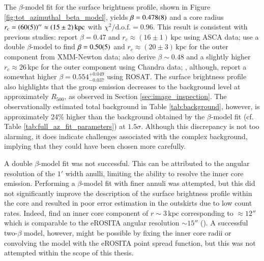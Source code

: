 The \(\beta\)-model fit for the surface brightness profile, shown in Figure \ref{fig:tot_azimuthal_beta_model}, yields \(\beta = \num{0.478\pm0.008}\) and a core radius \(r_c = (\num{60\pm5})'' \approx (15\pm2)\,\text{kpc}\) with \(\chi^2/\text{d.o.f.} = 0.96\). This result is consistent with previous studies: \citep{Kawaharada_2003} report \(\beta = 0.47\) and \(r_c \approx (16\pm1)\,\text{kpc}\) using ASCA data; \citep{Kawaharada_2009} use a double \(\beta\)-model to find \(\beta = \num{0.50\pm0.05}\) and \(r_c \approx (20\pm3)\,\text{kpc}\) for the outer component from XMM-Newton data; \citep{Sun_2003} also derive \(\beta \sim 0.48\) and a slightly higher \(r_c \approx 26\,\text{kpc}\) for the outer component using Chandra data; \citep{Reiprich_2002}, although, report a somewhat higher \(\beta = 0.554^{+0.049}_{-0.037}\) using ROSAT. The surface brightness profile also highlights that the group emission decreases to the background level at approximately \(R_{500}\), as observed in Section \ref{sec:image_inspection}. The observationally estimated total background in Table \ref{tab:background}, however, is approximately 24\% higher than the background obtained by the \(\beta\)-model fit (cf. Table \ref{tab:full_az_fit_parameters}) at \(1.5\sigma\). Although this discrepancy is not too alarming, it does indicate challenges associated with the complex background, implying that they could have been chosen more carefully.

A double \(\beta\)-model fit was not successful. This can be attributed to the angular resolution of the \(1'\) width anulli, limiting the ability to resolve the inner core emission. Performing a \(\beta\)-model fit with finer annuli was attempted, but this did not significantly improve the description of the surface brightness profile within the core and resulted in poor error estimation in the outskirts due to low count rates. Indeed, \citep{Kawaharada_2009} find an inner core component of \(r \sim 3\,\text{kpc}\) corresponding to \(\approx 12'' \) which is comparable to the eROSITA angular resolution \(\sim 15''\) (\cite{Predehl2021}). A successful two-\(\beta\) model, however, might be possible by fixing the inner core radii or convolving the model with the eROSITA point spread function, but this was not attempted within the scope of this thesis.
